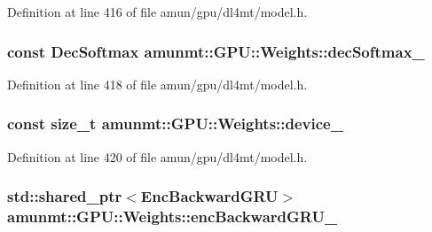Definition at line 416 of file amun/gpu/dl4mt/model.\+h.

\subsubsection[{\texorpdfstring{dec\+Softmax\+\_\+}{decSoftmax_}}]{\setlength{\rightskip}{0pt plus 5cm}const {\bf Dec\+Softmax} amunmt\+::\+G\+P\+U\+::\+Weights\+::dec\+Softmax\+\_\+}\hypertarget{structamunmt_1_1GPU_1_1Weights_aaebd4d22c9dcebd7e000ecad3b154c38}{}\label{structamunmt_1_1GPU_1_1Weights_aaebd4d22c9dcebd7e000ecad3b154c38}


Definition at line 418 of file amun/gpu/dl4mt/model.\+h.

\subsubsection[{\texorpdfstring{device\+\_\+}{device_}}]{\setlength{\rightskip}{0pt plus 5cm}const size\+\_\+t amunmt\+::\+G\+P\+U\+::\+Weights\+::device\+\_\+}\hypertarget{structamunmt_1_1GPU_1_1Weights_ac3a0d691e36aafe2377ccbd9270aa642}{}\label{structamunmt_1_1GPU_1_1Weights_ac3a0d691e36aafe2377ccbd9270aa642}


Definition at line 420 of file amun/gpu/dl4mt/model.\+h.

\subsubsection[{\texorpdfstring{enc\+Backward\+G\+R\+U\+\_\+}{encBackwardGRU_}}]{\setlength{\rightskip}{0pt plus 5cm}std\+::shared\+\_\+ptr$<${\bf Enc\+Backward\+G\+RU}$>$ amunmt\+::\+G\+P\+U\+::\+Weights\+::enc\+Backward\+G\+R\+U\+\_\+}\hypertarget{structamunmt_1_1GPU_1_1Weights_abbf3ec77d064c218b7c4cb0262232a5d}{}\label{structamunmt_1_1GPU_1_1Weights_abbf3ec77d064c218b7c4cb0262232a5d}


